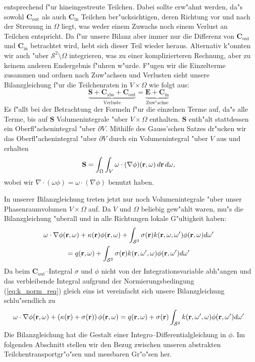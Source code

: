 \documentclass[11pt,a4paper,DIVcalc,BCOR8mm,titlepage,twoside]{scrartcl}
\begin{document}
	entsprechend f"ur hineingestreute Teilchen. Dabei sollte erw"ahnt werden, da"s sowohl $\mathbf{C}_\text{out}$ als auch $\mathbf{C}_\text{in}$ Teilchen ber"ucksichtigen, deren Richtung vor und nach der Streuung in $\Omega$ liegt, was weder einem Zuwachs noch einem Verlust an Teilchen entspricht. Da f"ur unsere Bilanz aber immer nur die Differenz von $\mathbf{C}_\text{out}$ und $\mathbf{C}_\text{in}$ betrachtet wird, hebt sich dieser Teil wieder heraus. Alternativ k"onnten wir auch "uber $\mathcal{S}^2 \setminus \Omega$ integrieren, was zu einer komplizierteren Rechnung, aber zu keinem anderen Endergebnis f"uhren w"urde. F"ugen wir die Einzelterme zusammen und ordnen nach Zuw"achsen und Verlusten sieht unsere Bilanzgleichung f"ur die Teilchenraten in $V \times \Omega$ wie folgt aus:
	$$\underbrace{\mathbf{S}+\mathbf{C}_\text{abs}+\mathbf{C}_\text{out}}_\text{Verluste}=\underbrace{\mathbf{E}+\mathbf{C}_\text{in}}_\text{Zuw"achse}$$
	Es f"allt bei der Betrachtung der Formeln f"ur die einzelnen Terme auf, da"s alle Terme, bis auf $\mathbf{S}$ Volumenintegrale "uber $V \times \Omega$ enthalten. $\mathbf{S}$ enth"alt stattdessen ein Oberfl"achenintegral "uber $\partial V$. Mithilfe des Gauss'schen Satzes dr"ucken wir das Oberfl"achenintegral "uber $\partial V$ durch ein Volumenintegral "uber $V$ aus und erhalten
	$$\mathbf{S}=\int_\Omega \int_V \omega \cdot (\nabla\phi)(\mathbf{r},\omega)\,d\mathbf{r}\,d\omega,$$
	wobei wir $\nabla \cdot(\omega\phi)=\omega\cdot(\nabla\phi)$ benutzt haben.
	
	In unserer Bilanzgleichung treten jetzt nur noch Volumenintegrale "uber unser Phasenraumvolumen $V \times \Omega$ auf. Da $V$ und $\Omega$ beliebig gew"ahlt waren, mu"s die Bilanzgleichung "uberall und in alle Richtungen lokale G"ultigkeit haben:
	\begin{multline*}
	  \omega\cdot\nabla\phi(\mathbf{r},\omega)+\kappa(\mathbf{r})\phi(\mathbf{r},\omega)+\int_{\mathcal{S}^2}\sigma(\mathbf{r})k(\mathbf{r},\omega,\omega')\phi(\mathbf{r},\omega)d\omega' \\
	  =q(\mathbf{r},\omega)+\int_{\mathcal{S}^2}\sigma(\mathbf{r})k(\mathbf{r},\omega',\omega)\phi(\mathbf{r},\omega')d\omega'
	\end{multline*}
	Da beim $\mathbf{C}_\text{out}$--Integral $\sigma$ und $\phi$ nicht von der Integrationsvariable abh"angen und das verbleibende Integral aufgrund der Normierungsbedingung (\ref{eq:k_norm_req}) gleich eins ist vereinfacht sich unsere Bilanzgleichung schlu"sendlich zu
	\begin{equation}\label{eq:particle_balance_equation}
	  \omega\cdot\nabla\phi(\mathbf{r},\omega)+\left(\kappa(\mathbf{r})+\sigma(\mathbf{r})\right)\phi(\mathbf{r},\omega)
	  =q(\mathbf{r},\omega)+\sigma(\mathbf{r})\int_{\mathcal{S}^2}k(\mathbf{r},\omega',\omega)\phi(\mathbf{r},\omega')d\omega'
	\end{equation}
	Die Bilanzgleichung hat die Gestalt einer Integro--Differentialgleichung in $\phi$.
	Im folgenden Abschnitt stellen wir den Bezug zwischen unseren abstrakten Teilchentransportgr"o"sen und messbaren Gr"o"sen her.
\end{document}
